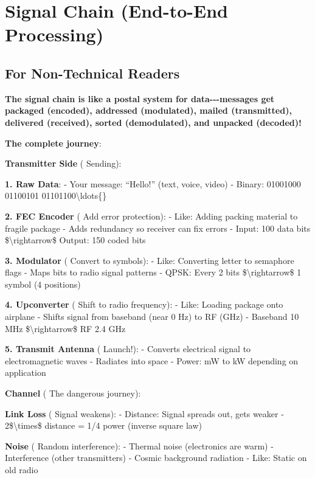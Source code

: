 \section{Signal Chain (End-to-End
Processing)}\label{signal-chain-end-to-end-processing}

\subsection{\texorpdfstring{ For Non-Technical
Readers}{ For Non-Technical Readers}}\label{for-non-technical-readers}

\textbf{The signal chain is like a postal system for data-\/-\/-messages
get packaged (encoded), addressed (modulated), mailed (transmitted),
delivered (received), sorted (demodulated), and unpacked (decoded)!}

\textbf{The complete journey}:

\textbf{Transmitter Side} ( Sending):

\textbf{1. Raw Data}: - Your message: ``Hello!'' (text, voice, video) -
Binary: 01001000 01100101 01101100\textbackslash ldots\{\}

\textbf{2. FEC Encoder} ( Add error protection): - Like: Adding packing
material to fragile package - Adds redundancy so receiver can fix errors
- Input: 100 data bits \$\textbackslash rightarrow\$ Output: 150 coded
bits

\textbf{3. Modulator} ( Convert to symbols): - Like: Converting letter
to semaphore flags - Maps bits to radio signal patterns - QPSK: Every 2
bits \$\textbackslash rightarrow\$ 1 symbol (4 positions)

\textbf{4. Upconverter} ( Shift to radio frequency): - Like: Loading
package onto airplane - Shifts signal from baseband (near 0 Hz) to RF
(GHz) - Baseband 10 MHz \$\textbackslash rightarrow\$ RF 2.4 GHz

\textbf{5. Transmit Antenna} ( Launch!): - Converts electrical signal to
electromagnetic waves - Radiates into space - Power: mW to kW depending
on application

\textbf{Channel} ( The dangerous journey):

\textbf{Link Loss} ( Signal weakens): - Distance: Signal spreads out,
gets weaker - 2\$\textbackslash times\$ distance = 1/4 power (inverse
square law)

\textbf{Noise} ( Random interference): - Thermal noise (electronics are
warm) - Interference (other transmitters) - Cosmic background radiation
- Like: Static on old radio

